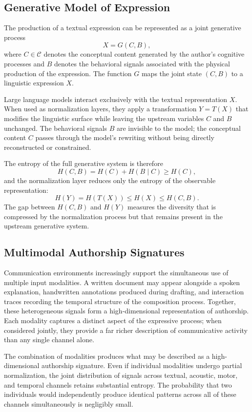 \documentclass[12pt,a4paper]{article}
\theoremstyle{definition}
\theoremstyle{plain}
\theoremstyle{remark}
\newcommand{\calC}{\mathcal{C}}
\begin{document}
\subsection{Generative Model of Expression}

The production of a textual expression can be represented as a joint generative process
\[
X = G(C, B),
\]
where $C \in \calC$ denotes the conceptual content generated by the author's cognitive
processes and $B$ denotes the behavioral signals associated with the physical production of
the expression. The function $G$ maps the joint state $(C, B)$ to a linguistic expression
$X$.

Large language models interact exclusively with the textual representation $X$. When used as
normalization layers, they apply a transformation $Y = T(X)$ that modifies the linguistic
surface while leaving the upstream variables $C$ and $B$ unchanged. The behavioral signals
$B$ are invisible to the model; the conceptual content $C$ passes through the model's
rewriting without being directly reconstructed or constrained.

The entropy of the full generative system is therefore
\[
H(C, B) = H(C) + H(B \mid C) \geq H(C),
\]
and the normalization layer reduces only the entropy of the observable representation:
\[
H(Y) = H(T(X)) \leq H(X) \leq H(C, B).
\]
The gap between $H(C,B)$ and $H(Y)$ measures the diversity that is compressed by the
normalization process but that remains present in the upstream generative system.

\subsection{Multimodal Authorship Signatures}

Communication environments increasingly support the simultaneous use of multiple input
modalities. A written document may appear alongside a spoken explanation, handwritten
annotations produced during drafting, and interaction traces recording the temporal structure
of the composition process. Together, these heterogeneous signals form a high-dimensional
representation of authorship. Each modality captures a distinct aspect of the expressive
process; when considered jointly, they provide a far richer description of communicative
activity than any single channel alone.

The combination of modalities produces what may be described as a high-dimensional authorship
signature. Even if individual modalities undergo partial normalization, the joint distribution
of signals across textual, acoustic, motor, and temporal channels retains substantial entropy.
The probability that two individuals would independently produce identical patterns across all
of these channels simultaneously is negligibly small.
\end{document}
